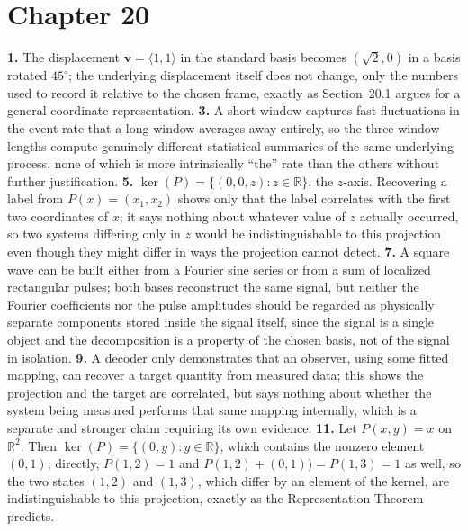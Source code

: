 \section*{Chapter 20}
\textbf{1.} The displacement $\mathbf{v}=\langle1,1\rangle$ in the
standard basis becomes $(\sqrt2,0)$ in a basis rotated $45^\circ$; the
underlying displacement itself does not change, only the numbers used
to record it relative to the chosen frame, exactly as Section~20.1
argues for a general coordinate representation. \quad
\textbf{3.} A short window captures fast fluctuations in the event rate
that a long window averages away entirely, so the three window lengths
compute genuinely different statistical summaries of the same
underlying process, none of which is more intrinsically ``the'' rate
than the others without further justification. \quad
\textbf{5.} $\ker(P) = \{(0,0,z): z\in\mathbb{R}\}$, the $z$-axis.
Recovering a label from $P(x)=(x_1,x_2)$ shows only that the label
correlates with the first two coordinates of $x$; it says nothing about
whatever value of $z$ actually occurred, so two systems differing only
in $z$ would be indistinguishable to this projection even though they
might differ in ways the projection cannot detect. \quad
\textbf{7.} A square wave can be built either from a Fourier sine series
or from a sum of localized rectangular pulses; both bases reconstruct
the same signal, but neither the Fourier coefficients nor the pulse
amplitudes should be regarded as physically separate components stored
inside the signal itself, since the signal is a single object and the
decomposition is a property of the chosen basis, not of the signal in
isolation. \quad
\textbf{9.} A decoder only demonstrates that an observer, using some
fitted mapping, can recover a target quantity from measured data; this
shows the projection and the target are correlated, but says nothing
about whether the system being measured performs that same mapping
internally, which is a separate and stronger claim requiring its own
evidence. \quad
\textbf{11.} Let $P(x,y)=x$ on $\mathbb{R}^2$. Then $\ker(P) =
\{(0,y):y\in\mathbb{R}\}$, which contains the nonzero element $(0,1)$;
directly, $P(1,2)=1$ and $P(1,2)+(0,1)) = P(1,3)=1$ as well, so the two
states $(1,2)$ and $(1,3)$, which differ by an element of the kernel,
are indistinguishable to this projection, exactly as the Representation
Theorem predicts.
